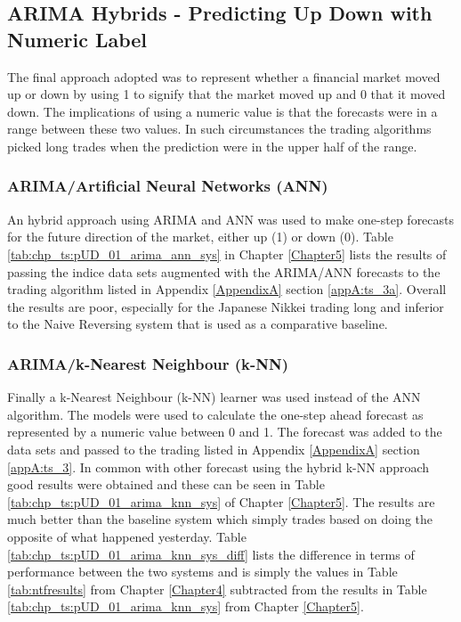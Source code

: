 


\subsection{ARIMA Hybrids - Predicting Up Down with Numeric Label}
The final approach adopted was to represent whether a financial market moved up or down by using 1 to signify that the market moved up and 0 that it moved down. The implications of using a numeric value is that the forecasts were in a range between these two values. In such circumstances the trading algorithms picked long trades when the prediction were in the upper half of the range.

\subsubsection{ARIMA/Artificial Neural Networks (ANN)}
An hybrid approach using ARIMA and ANN was used to make one-step forecasts for the future direction of the market, either up (1) or down (0). Table \ref{tab:chp_ts:pUD_01_arima_ann_sys} in Chapter \ref{Chapter5} lists the results of passing the indice data sets augmented with the ARIMA/ANN forecasts to the trading algorithm listed in Appendix \ref{AppendixA} section \ref{appA:ts_3a}.  Overall the results are poor, especially for the Japanese Nikkei trading long and inferior to the Naive Reversing system that is used as a comparative baseline.

\subsubsection{ARIMA/k-Nearest Neighbour (k-NN)}
Finally a k-Nearest Neighbour (k-NN) learner was used instead of the ANN algorithm. The models were used to calculate the one-step ahead forecast as represented by a numeric value between 0 and 1. The forecast was added to the data sets and passed to the trading listed in Appendix \ref{AppendixA} section \ref{appA:ts_3}. In common with other forecast using the hybrid k-NN approach good results were obtained and these can be seen in Table \ref{tab:chp_ts:pUD_01_arima_knn_sys} of Chapter \ref{Chapter5}. The results are much better than the baseline system which simply trades based on doing the opposite of what happened yesterday. Table \ref{tab:chp_ts:pUD_01_arima_knn_sys_diff} lists the difference in terms of performance between the two systems and is simply the values in  Table \ref{tab:ntfresults} from Chapter \ref{Chapter4} subtracted from the results in Table \ref{tab:chp_ts:pUD_01_arima_knn_sys} from Chapter \ref{Chapter5}.

